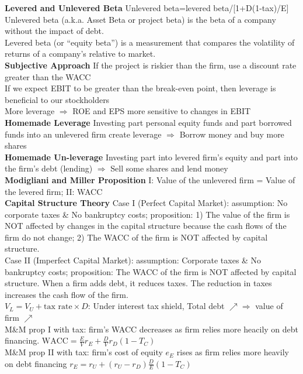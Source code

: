 \documentclass[12pt,landscape, a4paper]{article}
\theoremstyle{remark}
\begin{document}
\begin{multicols*}{3}
\textbf{Levered and Unlevered Beta} Unlevered beta=levered beta/[1+D(1-tax)/E]\\
Unlevered beta (a.k.a. Asset Beta or project beta) is the beta of a company without the impact of debt.\\
Levered beta (or “equity beta”) is a measurement that compares the volatility of returns of a company’s relative to market.\\
\textbf{Subjective Approach} If the project is riskier than the firm, use a discount rate greater than the WACC\\
If we expect EBIT to be greater than the break-even point, then leverage is beneficial to our stockholders\\
More leverage $\Rightarrow$ ROE and EPS more sensitive to changes in EBIT\\
\textbf{Homemade Leverage} Investing part personal equity funds and part borrowed funds into an unlevered firm create leverage $\Rightarrow$ Borrow money and buy more shares\\
\textbf{Homemade Un-leverage}  Investing part into levered firm’s equity and part into the firm’s debt (lending) $\Rightarrow$ Sell some shares and lend money\\
\textbf{Modigliani and Miller Proposition}  I: Value of the unlevered firm = Value of the levered firm; II: WACC\\
\textbf{Capital Structure Theory} Case I (Perfect Capital Market): assumption: No corporate taxes \& No bankruptcy costs; proposition: 1) The value of the firm is NOT affected by changes in the capital structure because the cash flows of the firm do not change; 2) The WACC of the firm is NOT affected by capital structure. \\
Case II (Imperfect Capital Market): assumption: Corporate taxes \& No bankruptcy costs; proposition: The WACC of the firm is NOT affected by capital structure. When a firm adds debt, it reduces taxes. The reduction in taxes increases the cash flow of the firm.\\
$V_L = V_U + \text{tax rate}\times D$: Under interest tax shield, Total debt $\nearrow \Rightarrow$ value of firm $\nearrow$\\
M\&M prop I with tax: firm's WACC decreases as firm relies more heacily on debt financing. $\mathrm{WACC} = \frac{E}{V}r_E + \frac{D}{V}r_D (1-T_C)$\\
M\&M prop II with tax: firm's cost of equity $e_E$ rises as firm relies more heavily on debt financing $r_E = r_U + (r_U - r_D) \frac{D}{E} (1-T_C)$\\

\end{multicols*}
\end{document}
